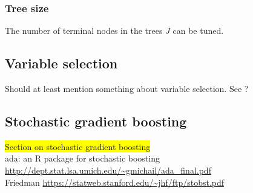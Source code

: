 \subsubsection{Tree size}
\label{sub:Tree size}
The number of terminal nodes in the trees $J$ can be tuned.


\subsection{Variable selection}
\label{sub:Variable selection}
Should at least mention something about variable selection. See \cite[sec. 8.1]{friedman}?



\subsection{Stochastic gradient boosting}
\label{sub:Stochastic gradient boosting}

\colorbox{yellow}{Section on stochastic gradient boosting}\\
ada: an R package for stochastic boosting \url{http://dept.stat.lsa.umich.edu/~gmichail/ada_final.pdf} \\
Friedman \url{https://statweb.stanford.edu/~jhf/ftp/stobst.pdf} \\
